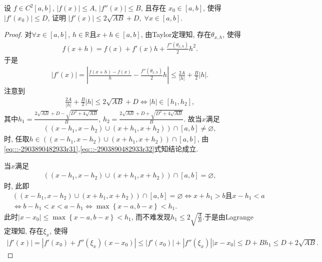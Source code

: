 \documentclass[../../main.tex]{subfiles}%
\begin{document}
\begin{example}
设 $f \in C^2[a,b]$, $|f(x)| \leqslant A$, $|f''(x)| \leqslant B$, 且存在 $x_0 \in [a,b]$, 使得 $|f'(x_0)| \leqslant D$, 证明
$|f'(x)| \leqslant 2\sqrt{AB} + D,\; \forall x \in [a,b]$.
\end{example}
\begin{proof}

对$\forall x\in \left[ a,b \right]$, $h\in \mathbb{R}$且$x+h\in \left[ a,b \right]$, 由Taylor定理知, 存在$\theta _{x,h}$, 使得
\begin{align}
f\left( x+h \right) =f\left( x \right) +f'(x) h+\frac{f'' \left( \theta _{x,h} \right)}{2}h^2. \label{eq:::-2903890482933r31}
\end{align}
于是
\begin{align*}
\left| f'(x) \right|=\left| \frac{f\left( x+h \right) -f\left( x \right)}{h}-\frac{f'' \left( \theta _{x,h} \right)}{2}h \right|\leqslant \frac{2A}{\left| h \right|}+\frac{B}{2}\left| h \right|.
\end{align*}
注意到
\begin{align}
\frac{2A}{\left| h \right|}+\frac{B}{2}\left| h \right|\leqslant 2\sqrt{AB}+D \Longleftrightarrow \left| h \right|\in \left[ h_1,h_2 \right], \label{eq:::-2903890482933r32}
\end{align}
其中$h_1=\frac{2\sqrt{AB}+D-\sqrt{D^2+4\sqrt{AB}}}{B}$, $h_2=\frac{2\sqrt{AB}+D+\sqrt{D^2+4\sqrt{AB}}}{B}.$
故当$x$满足
\begin{align*}
\left( \left( x-h_1,x-h_2 \right) \cup \left( x+h_1,x+h_2 \right) \right) \cap \left[ a,b \right] \ne \varnothing,
\end{align*}
时, 任取$h\in \left( \left( x-h_1,x-h_2 \right) \cup \left( x+h_1,x+h_2 \right) \right) \cap \left[ a,b \right]$, 由\eqref{eq:::-2903890482933r31},\eqref{eq:::-2903890482933r32}式知结论成立.

当$x$满足
\begin{align*}
\left( \left( x-h_1,x-h_2 \right) \cup \left( x+h_1,x+h_2 \right) \right) \cap \left[ a,b \right] = \varnothing,
\end{align*}
时, 此即
\begin{align*}
&\left( \left( x-h_1,x-h_2 \right) \cup \left( x+h_1,x+h_2 \right) \right) \cap \left[ a,b \right] = \varnothing \Longleftrightarrow x+h_1>b \text{且} x-h_1<a \\
&\Longleftrightarrow b-h_1<x<a-h_1 \Longleftrightarrow \max\left\{ x-a,b-x \right\} <h_1.
\end{align*}
此时$\left| x-x_0 \right|\leqslant \max\left\{ x-a,b-x \right\} <h_1$, 而不难发现$h_1\leqslant 2\sqrt{\frac{A}{B}}.$于是由Lagrange定理知, 存在$\xi _x$, 使得
\begin{align*}
\left| f'(x) \right|=\left| f'(x_0) +f'' \left( \xi _x \right) \left( x-x_0 \right) \right|\leqslant \left| f'(x_0) \right|+\left| f'' \left( \xi _x \right) \right|\left| x-x_0 \right|\leqslant D+Bh_1\leqslant D+2\sqrt{AB}.
\end{align*}

\end{proof}
\end{document}
